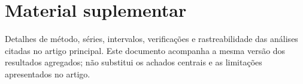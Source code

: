 \documentclass[12pt,a4paper]{article}
\begin{document}
\section*{Material suplementar}
Detalhes de método, séries, intervalos, verificações e rastreabilidade das análises citadas no artigo principal. Este documento acompanha a mesma versão dos resultados agregados; não substitui os achados centrais e as limitações apresentados no artigo.



\end{document}
